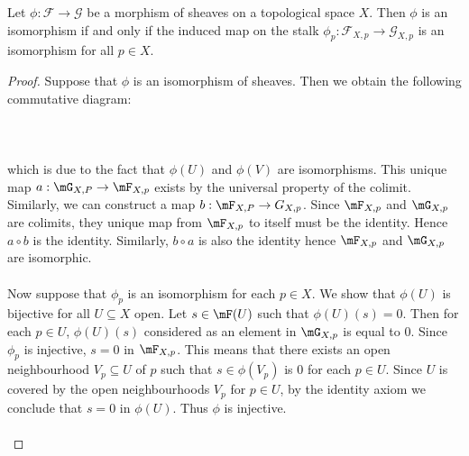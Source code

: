 \documentclass[a4paper]{article}
\begin{document}
\begin{prp}{}{} Let $\phi:\mathcal{F}\to\mathcal{G}$ be a morphism of sheaves on a topological space $X$. Then $\phi$ is an isomorphism if and only if the induced map on the stalk $\phi_p:\mathcal{F}_{X,p}\to\mathcal{G}_{X,p}$ is an isomorphism for all $p\in X$. \tcbline
\begin{proof}
Suppose that $\phi$ is an isomorphism of sheaves. Then we obtain the following commutative diagram: \\~\\
 \\~\\
which is due to the fact that $\phi(U)$ and $\phi(V)$ are isomorphisms. This unique map $a:\mG_{X,P}\to\mF_{X,p}$ exists by the universal property of the colimit. Similarly, we can construct a map $b:\mF_{X,P}\to G_{X,p}$. Since $\mF_{X,p}$ and $\mG_{X,p}$ are colimits, they unique map from $\mF_{X,p}$ to itself must be the identity. Hence $a\circ b$ is the identity. Similarly, $b\circ a$ is also the identity hence $\mF_{X,p}$ and $\mG_{X,p}$ are isomorphic. \\~\\

Now suppose that $\phi_p$ is an isomorphism for each $p\in X$. We show that $\phi(U)$ is bijective for all $U\subseteq X$ open. Let $s\in\mF(U)$ such that $\phi(U)(s)=0$. Then for each $p\in U$, $\phi(U)(s)$ considered as an element in $\mG_{X,p}$ is equal to $0$. Since $\phi_p$ is injective, $s=0$ in $\mF_{X,p}$. This means that there exists an open neighbourhood $V_p\subseteq U$ of $p$ such that $s\in\phi(V_p)$ is $0$ for each $p\in U$. Since $U$ is covered by the open neighbourhoods $V_p$ for $p\in U$, by the identity axiom we conclude that $s=0$ in $\phi(U)$. Thus $\phi$ is injective. \\~\\


\end{proof}
\end{prp}
\end{document}
